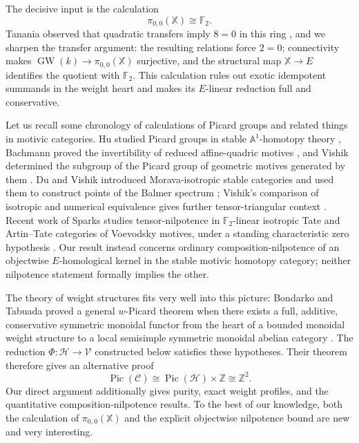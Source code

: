 \documentclass[11pt]{amsart}
\numberwithin{equation}{section}
\theoremstyle{definition}
\theoremstyle{remark}
\DeclareMathOperator{\Pic}{Pic}
\DeclareMathOperator{\GW}{GW}
\newcommand{\F}{\mathbb F_2}
\newcommand{\X}{\mathbb X}
\newcommand{\C}{\mathcal C}
\newcommand{\Hh}{\mathcal H}
\newcommand{\V}{\mathcal V}
\begin{document}
The decisive input is the calculation
\[
  \pi_{0,0}(\X)\cong\F.
\]
Tanania observed that quadratic transfers imply $8=0$ in this ring
\cite[Remark~3.6]{TananiaCellular}, and we sharpen the transfer argument:  the resulting relations force
$2=0$; connectivity makes $\GW(k)\to\pi_{0,0}(\X)$ surjective, and the
structural map $\X\to E$ identifies the quotient with $\F$.  This calculation
rules out exotic idempotent summands in the weight heart and makes its
$E$-linear reduction full and conservative.

Let us recall some chronology of calculations of Picard groups and related things in motivic categories. 
Hu studied Picard groups in stable $\mathbb A^1$-homotopy theory
\cite{HuPicard}, Bachmann proved the invertibility of reduced affine-quadric
motives \cite{BachmannAffine}, and Vishik determined the subgroup of the
Picard group of geometric motives generated by them
\cite{VishikAffinePicard}.  Du and Vishik introduced Morava-isotropic stable
categories and used them to construct points of the Balmer spectrum
\cite{DuVishikBalmer}; Vishik's comparison of isotropic and numerical
equivalence gives further tensor-triangular context \cite{VishikNumerical}.
Recent work of Sparks studies tensor-nilpotence in $\F$-linear isotropic Tate
and Artin--Tate categories of Voevodsky motives, under a standing
characteristic zero hypothesis \cite{SparksIsotropicTT}.  Our result instead
concerns ordinary composition-nilpotence of an objectwise $E$-homological
kernel in the stable motivic homotopy category; neither
nilpotence statement formally implies the other.

The theory of weight structures fits very well into this picture: Bondarko and Tabuada proved a general $w$-Picard theorem when there exists a
full, additive, conservative symmetric monoidal functor from the heart of a
bounded monoidal weight structure to a local semisimple symmetric monoidal
abelian category \cite[Theorem~1.1]{BondarkoTabuadaPicard}.  The reduction
$\Phi\colon\Hh\to\V$ constructed below satisfies these hypotheses.  Their
theorem therefore gives an alternative proof
\[
  \Pic(\C)\cong\Pic(\Hh)\times\mathbb Z\cong\mathbb Z^2.
\]
Our direct argument additionally gives purity, exact weight
profiles, and the quantitative composition-nilpotence results.  To the best
of our knowledge, both the calculation of $\pi_{0,0}(\X)$ and
the explicit objectwise nilpotence bound are new and very interesting.
\end{document}

